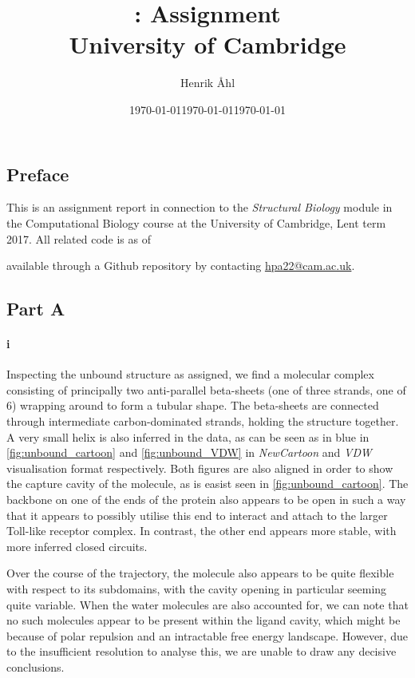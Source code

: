 \documentclass[10pt]{article}\usepackage[]{graphicx}\usepackage[]{color}
\title{
  \bf \course: Assignment \ass \\[1em]
  \small{University of Cambridge}
}
\author{Henrik Åhl}
\date{\today}
\theoremstyle{plain}
\newcommand{\course}{Structural Biology}
\newcommand{\term}{Lent term 2017}
\begin{document}
\date{\today}
\maketitle
\setcounter{page}{1}


\maketitle

\begin{multicols*}{2}
	\section*{Preface}
	This is an assignment report in connection to the \textit{\course}
	module in the Computational Biology course at the University of Cambridge,
	\term. All related code is as of \date{\today} available through a
	Github repository by contacting \href{mailto:hpa22@cam.ac.uk}{hpa22@cam.ac.uk}.
	\subsection*{Part A}
	\paragraph*{i}
	Inspecting the unbound structure as assigned, we find a molecular complex consisting of principally two anti-parallel beta-sheets (one of three strands, one of 6) wrapping around to form a tubular shape. The beta-sheets are connected through intermediate carbon-dominated strands, holding the structure together. A very small helix is also inferred in the data, as can be seen as in blue in \cref{fig:unbound_cartoon} and \cref{fig:unbound_VDW} in \emph{NewCartoon} and \emph{VDW} visualisation format respectively. Both figures are also aligned in order to show the capture cavity of the molecule, as is easist seen in \cref{fig:unbound_cartoon}. The backbone on one of the ends of the protein also appears to be open in such a way that it appears to possibly utilise this end to interact and attach to the larger Toll-like receptor complex. In contrast, the other end appears more stable, with more inferred closed circuits. 
		  
	Over the course of the trajectory, the molecule also appears to be quite flexible with respect to its subdomains, with the cavity opening in particular seeming quite variable. When the water molecules are also accounted for, we can note that no such molecules appear to be present within the ligand cavity, which might be because of polar repulsion and an intractable free energy landscape. However, due to the insufficient resolution to analyse this, we are unable to draw any decisive conclusions.
		

\end{multicols*}
\end{document}
